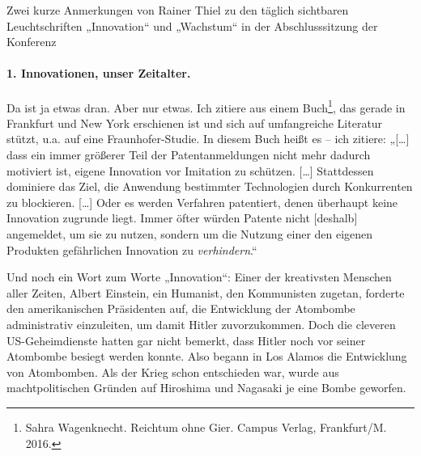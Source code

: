 \documentclass[12pt,a4paper]{article}
\begin{document}
Zwei kurze Anmerkungen von Rainer Thiel zu den täglich sichtbaren
Leuchtschriften „Innovation“ und „Wachstum“ in der Abschlusssitzung der
Konferenz

\paragraph{1. Innovationen, unser Zeitalter.}
Da ist ja etwas dran. Aber nur etwas. Ich zitiere aus einem
Buch\footnote{Sahra Wagenknecht. Reichtum ohne Gier. Campus Verlag,
  Frankfurt/M. 2016.}, das gerade in Frankfurt und New York erschienen ist und
sich auf umfangreiche Literatur stützt, u.a. auf eine Fraunhofer-Studie.  In
diesem Buch heißt es – ich zitiere: „[\ldots] dass ein immer größerer Teil der
Patentanmeldungen nicht mehr dadurch motiviert ist, eigene Innovation vor
Imitation zu schützen. [\ldots] Stattdessen dominiere das Ziel, die Anwendung
bestimmter Technologien durch Konkurrenten zu blockieren. [\ldots] Oder es
werden Verfahren patentiert, denen überhaupt keine Innovation zugrunde liegt.
Immer öfter würden Patente nicht [deshalb] angemeldet, um sie zu nutzen,
sondern um die Nutzung einer den eigenen Produkten gefährlichen Innovation zu
\emph{verhindern}.“

Und noch ein Wort zum Worte „Innovation“: Einer der kreativsten Menschen aller
Zeiten, Albert Einstein, ein Humanist, den Kommunisten zugetan, forderte den
amerikanischen Präsidenten auf, die Entwicklung der Atombombe administrativ
einzuleiten, um damit Hitler zuvorzukommen. Doch die cleveren US-Geheimdienste
hatten gar nicht bemerkt, dass Hitler noch vor seiner Atombombe besiegt werden
konnte. Also begann in Los Alamos die Entwicklung von Atombomben. Als der
Krieg schon entschieden war, wurde aus machtpolitischen Gründen auf Hiroshima
und Nagasaki je eine Bombe geworfen.
\end{document}

